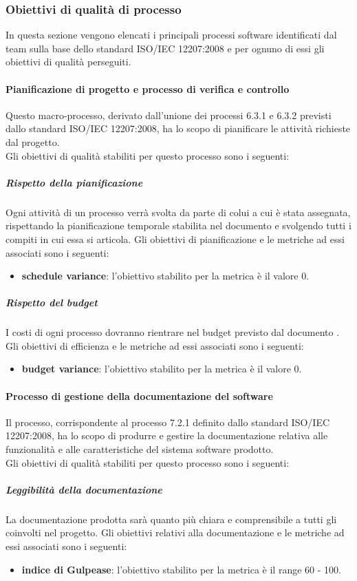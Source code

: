 		\subsubsection{Obiettivi di qualità di processo}
		In questa sezione vengono elencati i principali processi software identificati dal team sulla base dello standard ISO/IEC 12207:2008 e per ognuno di essi gli obiettivi di qualità perseguiti.
			
			\paragraph{Pianificazione di progetto e processo di verifica e controllo}
			Questo macro-processo, derivato dall'unione dei processi 6.3.1 e 6.3.2 previsti dallo standard ISO/IEC 12207:2008, ha lo scopo di pianificare le attività richieste dal progetto.
			\\Gli obiettivi di qualità stabiliti per questo processo sono i seguenti:
				\subparagraph{Rispetto della pianificazione} 
				Ogni attività di un processo verrà svolta da parte di colui a cui è stata assegnata, rispettando la pianificazione temporale stabilita nel documento \PdP{} e svolgendo tutti i compiti in cui essa si articola.
				Gli obiettivi di pianificazione e le metriche ad essi associati sono i seguenti:
		 		\begin{itemize}
					\item \textbf{schedule variance}: l'obiettivo stabilito per la metrica è il valore 0.
				\end{itemize}
				\subparagraph{Rispetto del budget}   
				I costi di ogni processo dovranno rientrare nel budget previsto dal documento \PdP.
				Gli obiettivi di efficienza e le metriche ad essi associati sono i seguenti:
		 		\begin{itemize}
					\item \textbf{budget variance}: l'obiettivo stabilito per la metrica è il valore 0.
				\end{itemize}
				
			\paragraph{Processo di gestione della documentazione del software}
			Il processo, corrispondente al processo 7.2.1 definito dallo standard ISO/IEC 12207:2008, ha lo scopo di produrre e gestire la documentazione relativa alle funzionalità e alle caratteristiche del sistema software prodotto.
			\\Gli obiettivi di qualità stabiliti per questo processo sono i seguenti:
				\subparagraph{Leggibilità della documentazione}
				La documentazione prodotta sarà quanto più chiara e comprensibile a tutti gli  coinvolti nel progetto.
				Gli obiettivi relativi alla documentazione e le metriche ad essi associati sono i seguenti:
		 		\begin{itemize}
					\item \textbf{indice di Gulpease}: l'obiettivo stabilito per la metrica è il range 60 - 100.
				\end{itemize}
				
